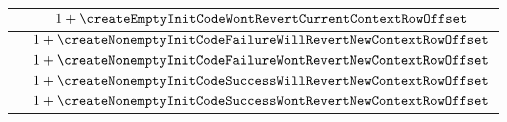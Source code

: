 \begin{center}
\begin{tabular}{|l|l|c|}
		\multicolumn{2}{|l|}{\scenCreateEmptyInitCodeWontRevert}                       & $1 + \createEmptyInitCodeWontRevertCurrentContextRowOffset       $ \\ \hline \hline
		\multicolumn{2}{|l|}{\scenCreateNonEmptyInitCodeFailureWillRevert}             & $1 + \createNonemptyInitCodeFailureWillRevertNewContextRowOffset $ \\ \hline
		\multicolumn{2}{|l|}{\scenCreateNonEmptyInitCodeSuccessWillRevert}             & $1 + \createNonemptyInitCodeFailureWontRevertNewContextRowOffset $ \\ \hline
		\multicolumn{2}{|l|}{\scenCreateNonEmptyInitCodeFailureWontRevert}             & $1 + \createNonemptyInitCodeSuccessWillRevertNewContextRowOffset $ \\ \hline
		\multicolumn{2}{|l|}{\scenCreateNonEmptyInitCodeSuccessWontRevert}             & $1 + \createNonemptyInitCodeSuccessWontRevertNewContextRowOffset $ \\ \hline
	\end{tabular}
\end{center}
